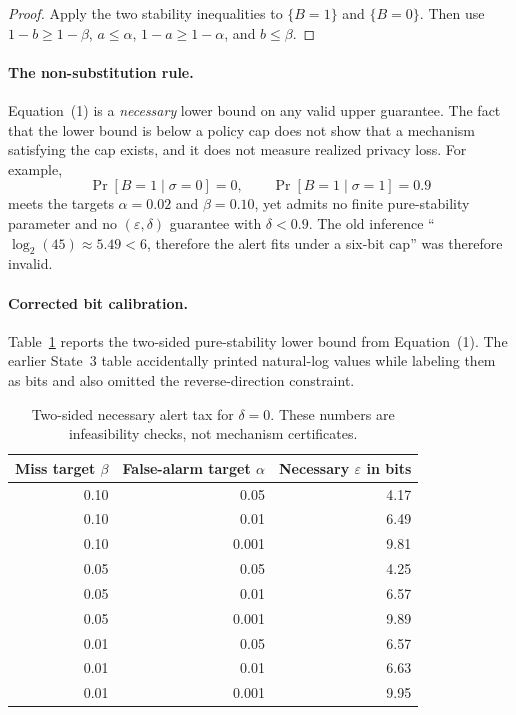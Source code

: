 \documentclass[11pt]{article}
\begin{document}
\begin{proof}
Apply the two stability inequalities to $\{B=1\}$ and $\{B=0\}$.
Then use $1-b\ge1-\beta$, $a\le\alpha$, $1-a\ge1-\alpha$, and $b\le\beta$.
\end{proof}

\paragraph{The non-substitution rule.}
Equation~(1) is a \emph{necessary} lower bound on any valid upper guarantee.
The fact that the lower bound is below a policy cap does not show that a mechanism satisfying the cap exists, and it does not measure realized privacy loss.
For example,
\[
\Pr[B=1\mid\sigma=0]=0,
\qquad
\Pr[B=1\mid\sigma=1]=0.9
\]
meets the targets $\alpha=0.02$ and $\beta=0.10$, yet admits no finite pure-stability parameter and no $(\varepsilon,\delta)$ guarantee with $\delta<0.9$.
The old inference ``$\log_2(45)\approx5.49<6$, therefore the alert fits under a six-bit cap'' was therefore invalid.

\paragraph{Corrected bit calibration.}
Table~\ref{tab:tax} reports the two-sided pure-stability lower bound from Equation~(1).
The earlier State~3 table accidentally printed natural-log values while labeling them as bits and also omitted the reverse-direction constraint.

\begin{table}[h]
\centering
\begin{tabular}{@{}rrr@{}}
\toprule
Miss target $\beta$ & False-alarm target $\alpha$ & Necessary $\varepsilon$ in bits \\
\midrule
0.10 & 0.05  & 4.17 \\
0.10 & 0.01  & 6.49 \\
0.10 & 0.001 & 9.81 \\
0.05 & 0.05  & 4.25 \\
0.05 & 0.01  & 6.57 \\
0.05 & 0.001 & 9.89 \\
0.01 & 0.05  & 6.57 \\
0.01 & 0.01  & 6.63 \\
0.01 & 0.001 & 9.95 \\
\bottomrule
\end{tabular}
\caption{Two-sided necessary alert tax for $\delta=0$.  These numbers are infeasibility checks, not mechanism certificates.}
\label{tab:tax}
\end{table}
\end{document}
